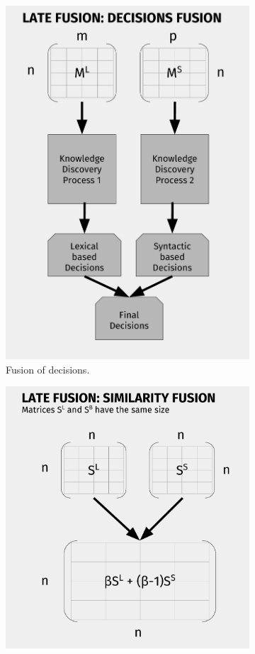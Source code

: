 \begin{figure}
	\centering
	\begin{subfigure}[t]{.5\textwidth}
	\centering
	\includegraphics[width=0.9\linewidth]{images/Chapitre3/lf1_diag.pdf}
	\caption{Fusion of decisions.}
	\label{fig:lf1}
	\end{subfigure}%
	\begin{subfigure}[t]{.5\textwidth}
	\centering
	\includegraphics[width=0.9\linewidth]{images/Chapitre3/lf2_diag.pdf}

\end{subfigure}
\end{figure}
